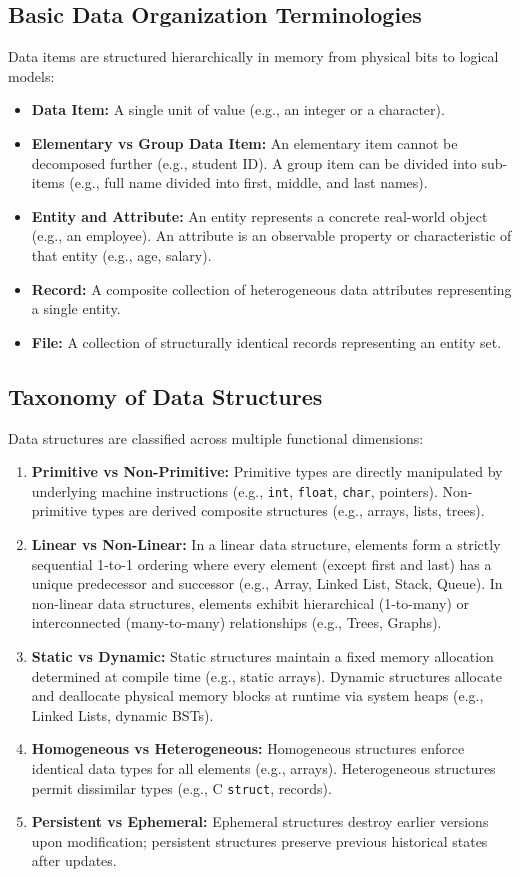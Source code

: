 \documentclass[12pt,a4paper]{article}
\begin{document}
\subsection{Basic Data Organization Terminologies}
Data items are structured hierarchically in memory from physical bits to logical models:
\begin{itemize}[leftmargin=*, itemsep=3pt]
  \item \textbf{Data Item:} A single unit of value (e.g., an integer or a character).
  \item \textbf{Elementary vs Group Data Item:} An elementary item cannot be decomposed further (e.g., student ID). A group item can be divided into sub-items (e.g., full name divided into first, middle, and last names).
  \item \textbf{Entity and Attribute:} An entity represents a concrete real-world object (e.g., an employee). An attribute is an observable property or characteristic of that entity (e.g., age, salary).
  \item \textbf{Record:} A composite collection of heterogeneous data attributes representing a single entity.
  \item \textbf{File:} A collection of structurally identical records representing an entity set.
\end{itemize}

\subsection{Taxonomy of Data Structures}
Data structures are classified across multiple functional dimensions:
\begin{enumerate}[leftmargin=*, itemsep=4pt]
  \item \textbf{Primitive vs Non-Primitive:} Primitive types are directly manipulated by underlying machine instructions (e.g., \texttt{int}, \texttt{float}, \texttt{char}, pointers). Non-primitive types are derived composite structures (e.g., arrays, lists, trees).
  \item \textbf{Linear vs Non-Linear:} In a linear data structure, elements form a strictly sequential 1-to-1 ordering where every element (except first and last) has a unique predecessor and successor (e.g., Array, Linked List, Stack, Queue). In non-linear data structures, elements exhibit hierarchical (1-to-many) or interconnected (many-to-many) relationships (e.g., Trees, Graphs).
  \item \textbf{Static vs Dynamic:} Static structures maintain a fixed memory allocation determined at compile time (e.g., static arrays). Dynamic structures allocate and deallocate physical memory blocks at runtime via system heaps (e.g., Linked Lists, dynamic BSTs).
  \item \textbf{Homogeneous vs Heterogeneous:} Homogeneous structures enforce identical data types for all elements (e.g., arrays). Heterogeneous structures permit dissimilar types (e.g., C \texttt{struct}, records).
  \item \textbf{Persistent vs Ephemeral:} Ephemeral structures destroy earlier versions upon modification; persistent structures preserve previous historical states after updates.
\end{enumerate}
\end{document}
